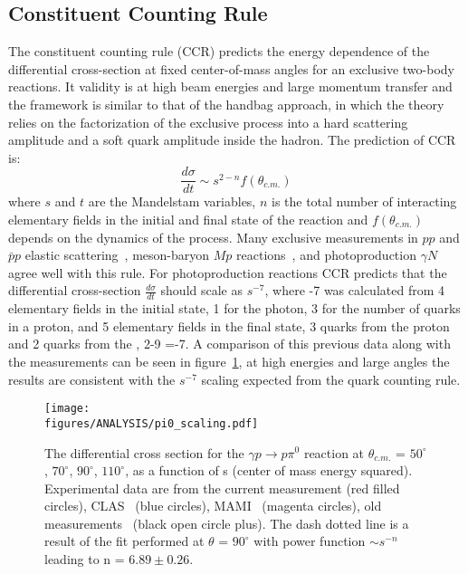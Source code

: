 \subsection{Constituent Counting Rule}
The constituent counting rule (CCR) predicts the energy dependence of the differential cross-section at fixed center-of-mass angles for an exclusive two-body reactions. It validity is at high beam energies and large momentum transfer and the framework is similar to that of the handbag approach, in which the theory relies on the factorization of the exclusive process into a hard scattering amplitude and a soft quark amplitude inside the hadron. The prediction of CCR is:
\begin{equation}
\frac{d\sigma}{dt} \sim s^{2-n}f(\theta_{c.m.}) \label{CCR}
\end{equation}
where $s$ and $t$ are the Mandelstam variables, $n$ is the total number of interacting elementary fields in the initial and final state of the reaction and $f(\theta_{c.m.})$ depends on the dynamics of the process. Many exclusive measurements in $pp$ and  $\bar{p}p$ elastic scattering~\cite{scalingexp5, scalingexp7}, meson-baryon $M p$ reactions~\cite{scalingexp7}, and photoproduction $\gamma N$~\cite{scalingexp2, scalingexp3, scalingexp4, scalingexp6, scalingexp8, scalingexp9, scalingexp10, scalingexp11} agree well with this rule. For \piz photoproduction reactions CCR predicts that the differential cross-section $\frac{d\sigma}{dt}$ should scale as $s^{-7}$, where -7 was calculated from 4 elementary fields in the initial state, 1 for the photon, 3 for the number of quarks in a proton, and 5 elementary fields in the final state, 3 quarks from the proton and  2 quarks from the \piz, 2-9 =-7. A comparison of this previous data along with the  measurements can be seen in figure~\ref{fig:pi0_scaling}, at high energies and large angles the results are consistent with the $s^{−7}$ scaling expected from the quark counting rule. 
\begin{figure}[h]
	\centerline{\texttt{[image: \\figures/ANALYSIS/pi0\_scaling.pdf]}}
	\caption{The differential cross section for the $\gamma p \to p \pi^0$ reaction at $\theta_{c.m.}$ = $50^{\circ}$, $70^{\circ}$, $90^{\circ}$, $110^{\circ}$, as a function of s (center of mass energy squared). Experimental data are from the current measurement (red filled circles), CLAS~\protect\cite{Dugger07,Dugger13} (blue circles), MAMI~\protect\cite{beck} (magenta circles), old measurements~\protect\cite{Joos} (black open circle plus). The dash dotted line is a result of the fit performed at $\theta$ = $90^{\circ}$ with power function $\sim s^{−n}$ leading to n = $6.89 \pm 0.26$.}
	\label{fig:pi0_scaling}
\end{figure}